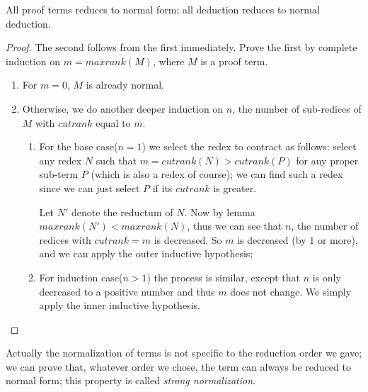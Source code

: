 \documentclass[../../../include/open-logic-section]{subfiles}
\begin{document}
\begin{thm}
  All proof terms reduces to normal form; all deduction reduces to
  normal deduction.
\end{thm}
\begin{proof}
  The second follows from the first immediately. Prove the first by
  complete induction on $m=maxrank(M)$, where $M$ is a proof term.
  \begin{enumerate}

  \item
    For $m=0$, $M$ is already normal.
    
  \item
    Otherwise, we do another deeper induction on $n$, the number of sub-redices of
    $M$ with $cutrank$ equal to $m$.
    \begin{enumerate}
    \item
      For the base case($n=1$) we select the redex to contract as follows: select any
      redex $N$ such that $m = cutrank(N) > cutrank(P)$ for any proper
      sub-term $P$ (which is also a redex of course); we can find such a redex since we can just select $P$
      if its $cutrank$ is greater.

      Let $N'$ denote the reductum of $N$. Now by lemma $maxrank(N') <
      maxrank(N)$, thus we can see that $n$, the number of redices with
      $cutrank=m$ is decreased. So $m$ is decreased (by $1$ or more), and
      we can apply the outer inductive hypothesis;

    \item
      For induction case($n>1$) the process is similar, except that $n$
      is only decreased to a positive number and thus $m$ does not change. We simply
      apply the inner inductive hypothesis.
    \end{enumerate}
\end{enumerate}
\end{proof}

Actually the normalization of terms is not specific to the reduction
order we gave; we can prove that, whatever order we chose, the term
can always be reduced to normal form; this property is called
\emph{strong normalization}.
\end{document}
